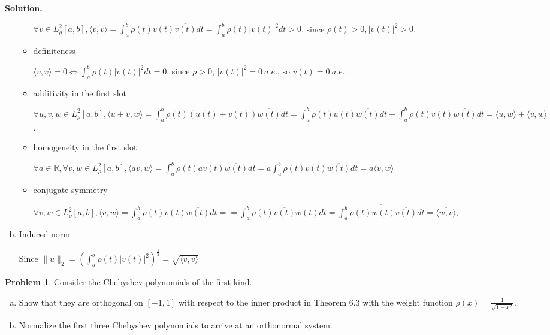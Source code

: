 \documentclass[a4paper]{book}
\newenvironment{solution}%
{\noindent\textbf{Solution.}}%
{\qedhere}
\numberwithin{equation}{chapter}
\theoremstyle{definition}
\newtheorem{pro}[exm]{Problem}
\begin{document}
\begin{solution}
\begin{enumerate}[(a)]
\begin{itemize}
      $\forall v \in L_\rho^2[a,b], \langle v,v \rangle = \int_a^b \rho(t) v(t) \overline{v(t)} dt = \int_a^b \rho(t) \left| v(t) \right|^2 dt > 0$, since $\rho(t) > 0, \left| v(t) \right|^2 > 0$.

    \item definiteness

      $\langle v,v \rangle = 0 \Longleftrightarrow \int_a^b \rho(t) \left| v(t) \right|^2 dt = 0$, since $\rho > 0$, $\left| v(t) \right|^2 = 0\ a.e. $, so $v(t) = 0\ a.e. $.

    \item additivity in the first slot

      $\forall u,v,w \in L_\rho^2[a,b], \langle u + v, w \rangle = \int_a^b \rho(t)(u(t) + v(t)) \overline{w(t)} dt =  \int_a^b \rho(t)u(t) \overline{w(t)} dt + \int_a^b \rho(t)v(t) \overline{w(t)} dt = \langle u,w \rangle + \langle v,w \rangle$.

    \item homogeneity in the first slot

      $\forall a \in \mathbb{R}, \forall v,w \in L_\rho^2 [a,b], \langle av,w \rangle = \int_a^b \rho(t)av(t) \overline{w(t)} dt = a\int_a^b \rho(t)v(t) \overline{w(t)} dt = a\langle v,w \rangle$.

    \item conjugate symmetry

      $\forall v,w \in L_\rho^2[a,b], \langle v,w \rangle = \int_a^b \rho(t)v(t) \overline{w(t)} dt = = \int_a^b \rho(t)\overline{\overline{v(t)}w(t)} dt = \overline{\int_a^b \rho(t)w(t) \overline{v(t)} dt} = \overline{\langle w,v \rangle}$.
    \end{itemize}

  \item Induced norm

    Since $\lVert u \rVert_2 = \left( \int_a^b \rho(t) \left| v(t) \right|^2 \right)^{\frac{1}{2}} = \sqrt{\langle v,v \rangle}$
  \end{enumerate}
\end{solution}

\begin{pro}
  Consider the Chebyshev polynomials of the first kind.
  \begin{enumerate}[(a)]
  \item Show that they are orthogonal on $[-1,1]$ with respect to the inner product in Theorem 6.3 with the weight function $\rho(x) = \frac{1}{\sqrt{1 -x^2}}$.

  \item Normalize the first three Chebyshev polynomials to arrive at an orthonormal system.
    
  \end{enumerate}
\end{pro}
\end{document}
